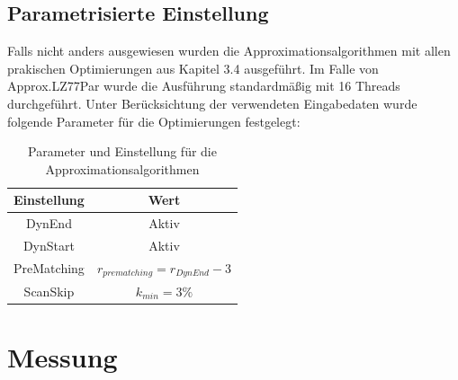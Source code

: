 \subsection{Parametrisierte Einstellung}
Falls nicht anders ausgewiesen wurden die Approximationsalgorithmen mit allen prakischen Optimierungen aus Kapitel 3.4 ausgeführt. Im Falle von Approx.LZ77Par
wurde die Ausführung standardmäßig mit 16 Threads durchgeführt. Unter Berücksichtung der verwendeten Eingabedaten wurde folgende Parameter für die 
Optimierungen festgelegt:
\begin{table} [ht]
    \centering
    \caption{Parameter und Einstellung für die Approximationsalgorithmen}
    \label{settings}
    \begin{tabular}{|c|c|}
        \hline
        \textbf{Einstellung} & \textbf{Wert} \\
        \hline
        DynEnd & Aktiv \\
        \hline
        DynStart & Aktiv \\
        \hline
        PreMatching & $r_{prematching}=r_{DynEnd}-3$ \\
        \hline
        ScanSkip & $k_{min}=3\%$ \\
        \hline
    \end{tabular}
\end{table}

\section{Messung}

